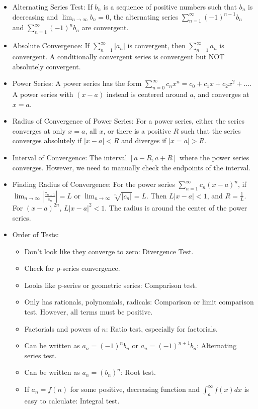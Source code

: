 \documentclass[10pt, portrait]{article}
\begin{document}
\begin{multicols*}{2}
\begin{itemize}
    \item Alternating Series Test: If $b_n$ is a sequence of positive numbers such that $b_n$ is decreasing and $\lim_{n \to \infty}b_n=0$, the alternating series $\sum_{n=1}^\infty (-1)^{n-1}b_n$ and $\sum_{n=1}^\infty (-1)^nb_n$ are convergent.
    \item Absolute Convergence: If $\sum_{n=1}^\infty |a_n|$ is convergent, then $\sum_{n=1}^\infty a_n$ is convergent. A conditionally convergent series is convergent but NOT absolutely convergent.
    \item Power Series: A power series has the form $\sum_{n=0}^\infty c_nx^n=c_0+c_1x+c_2x^2+...$. A power series with $(x-a)$ instead is centered around $a$, and converges at $x=a$.
    \item Radius of Convergence of Power Series: For a power series, either the series converges at only $x=a$, all $x$, or there is a positive $R$ such that the series converges absolutely if $|x-a|<R$ and diverges if $|x=a|>R$.
    \item Interval of Convergence: The interval $[a-R, a+R]$ where the power series converges. However, we need to manually check the endpoints of the interval.
    \item Finding Radius of Convergence: For the power series $\sum_{n=1}^\infty c_n(x-a)^n$, if $\lim_{n\to \infty}|\frac{c_{n+1}}{c_n}|=L$ or $\lim_{n\to \infty}\sqrt[n]{|c_n|}=L$. Then $L|x-a| < 1$, and $R=\frac{1}{L}$. For $(x-a)^{2n}$, $L|x-a|^2 < 1$. The radius is around the center of the power series.
    \item Order of Tests:
    \begin{itemize}
        \item Don't look like they converge to zero: Divergence Test.
        \item Check for p-series convergence.
        \item Looks like p-series or geometric series: Comparison test.
        \item Only has rationals, polynomials, radicals: Comparison or limit comparison test. However, all terms must be positive.
        \item Factorials and powers of $n$: Ratio test, especially for factorials.
        \item Can be written as $a_n=(-1)^nb_n$ or $a_n=(-1)^{n+1}b_n$: Alternating series test.
        \item Can be written as $a_n=(b_n)^n$: Root test.
        \item If $a_n=f(n)$ for some positive, decreasing function and $\int_a^\infty f(x)dx$ is easy to calculate: Integral test.

\end{itemize}
\end{itemize}
\end{multicols*}
\end{document}
